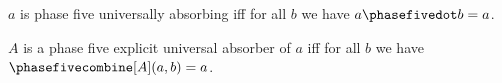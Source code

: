 

\begin{abbreviation}\label{phase5_context_quantified}
    $a$ is phase five universally absorbing iff
    for all $b$ we have $a\phasefivedot b = a$.
\end{abbreviation}

\begin{abbreviation}\label{phase5_context_quantified_explicit}
    $A$ is a phase five explicit universal absorber of $a$ iff
    for all $b$ we have $\phasefivecombine[A](a,b) = a$.
\end{abbreviation}
